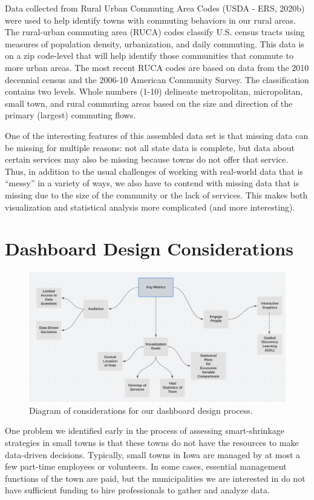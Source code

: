 \documentclass[print]{nuthesis}
\begin{document}
Data collected from Rural Urban Commuting Area Codes (USDA - ERS, 2020b) were used to help identify towns with commuting behaviors in our rural areas. The rural-urban commuting area (RUCA) codes classify U.S. census tracts using measures of population density, urbanization, and daily commuting. This data is on a zip code-level that will help identify those communities that commute to more urban areas. The most recent RUCA codes are based on data from the 2010 decennial census and the 2006-10 American Community Survey. The classification contains two levels. Whole numbers (1-10) delineate metropolitan, micropolitan, small town, and rural commuting areas based on the size and direction of the primary (largest) commuting flows.

One of the interesting features of this assembled data set is that missing data can be missing for multiple reasons: not all state data is complete, but data about certain services may also be missing because towns do not offer that service.
Thus, in addition to the usual challenges of working with real-world data that is ``messy'' in a variety of ways, we also have to contend with missing data that is missing due to the size of the community or the lack of services. This makes both visualization and statistical analysis more complicated (and more interesting).

\hypertarget{dashboard-design-considerations-1}{%
\section{Dashboard Design Considerations}\label{dashboard-design-considerations-1}}

\begin{figure}
\includegraphics[width=.8\textwidth]{figure/KeyMetrics.png}
\caption{Diagram of considerations for our dashboard design process.}\label{fig:metrics}
\end{figure}

One problem we identified early in the process of assessing smart-shrinkage strategies in small towns is that these towns do not have the resources to make data-driven decisions. Typically, small towns in Iowa are managed by at most a few part-time employees or volunteers. In some cases, essential management functions of the town are paid, but the municipalities we are interested in do not have sufficient funding to hire professionals to gather and analyze data.
\end{document}
